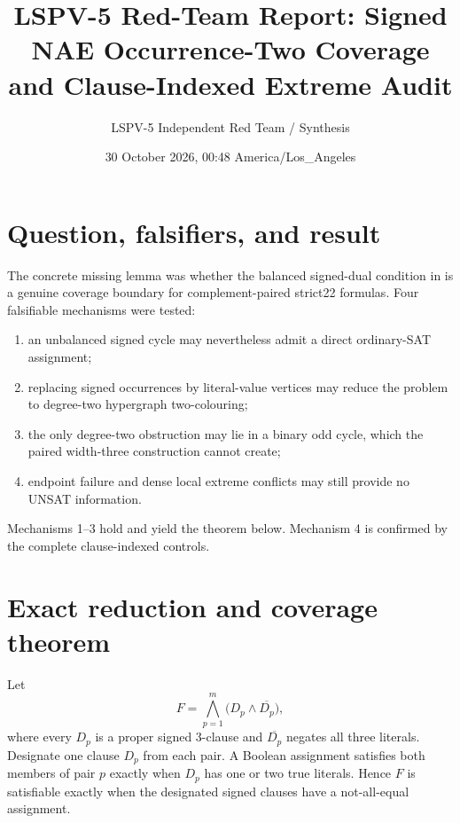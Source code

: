 \documentclass[11pt]{article}
\title{LSPV-5 Red-Team Report: Signed NAE Occurrence-Two Coverage\\
and Clause-Indexed Extreme Audit}
\author{LSPV-5 Independent Red Team / Synthesis}
\date{30 October 2026, 00:48 America/Los\_Angeles}
\begin{document}
\maketitle

\begin{center}
\end{center}

\section{Question, falsifiers, and result}

The concrete missing lemma was whether the balanced signed-dual condition in
is a genuine coverage boundary for complement-paired strict22 formulas.  Four
falsifiable mechanisms were tested:
\begin{enumerate}
\item an unbalanced signed cycle may nevertheless admit a direct ordinary-SAT
assignment;
\item replacing signed occurrences by literal-value vertices may reduce the
problem to degree-two hypergraph two-colouring;
\item the only degree-two obstruction may lie in a binary odd cycle, which the
paired width-three construction cannot create;
\item endpoint failure and dense local extreme conflicts may still provide no
UNSAT information.
\end{enumerate}
Mechanisms 1--3 hold and yield the theorem below.  Mechanism 4 is confirmed by
the complete clause-indexed controls.

\section{Exact reduction and coverage theorem}

Let
\[
 F=\bigwedge_{p=1}^{m}\bigl(D_p\wedge\overline{D_p}\bigr),
\]
where every $D_p$ is a proper signed 3-clause and
$\overline{D_p}$ negates all three literals.  Designate one clause $D_p$ from
each pair.  A Boolean assignment satisfies both members of pair $p$ exactly
when $D_p$ has one or two true literals.  Hence $F$ is satisfiable exactly
when the designated signed clauses have a not-all-equal assignment.
\end{document}
